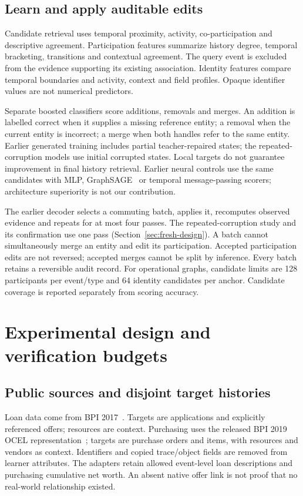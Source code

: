 \documentclass[11pt]{article}
\begin{document}
\subsection{Learn and apply auditable edits}
Candidate retrieval uses temporal proximity, activity, co-participation and descriptive agreement. Participation features summarize history degree, temporal bracketing, transitions and contextual agreement. The query event is excluded from the evidence supporting its existing association. Identity features compare temporal boundaries and activity, context and field profiles. Opaque identifier values are not numerical predictors.

Separate boosted classifiers score additions, removals and merges. An addition is labelled correct when it supplies a missing reference entity; a removal when the current entity is incorrect; a merge when both handles refer to the same entity. Earlier generated training includes partial teacher-repaired states; the repeated-corruption models use initial corrupted states. Local targets do not guarantee improvement in final history retrieval. Earlier neural controls use the same candidates with MLP, GraphSAGE~\cite{graphsage} or temporal message-passing scorers; architecture superiority is not our contribution.

The earlier decoder selects a commuting batch, applies it, recomputes observed evidence and repeats for at most four passes. The repeated-corruption study and its confirmation use one pass (Section~\ref{sec:fresh-design}). A batch cannot simultaneously merge an entity and edit its participation. Accepted participation edits are not reversed; accepted merges cannot be split by inference. Every batch retains a reversible audit record. For operational graphs, candidate limits are 128 participants per event/type and 64 identity candidates per anchor. Candidate coverage is reported separately from scoring accuracy.

\section{Experimental design and verification budgets}
\subsection{Public sources and disjoint target histories}
Loan data come from BPI 2017~\cite{bpi2017}. Targets are applications and explicitly referenced offers; resources are context. Purchasing uses the released BPI 2019 OCEL representation~\cite{bpi2019,bpiconversion,bpiocel}; targets are purchase orders and items, with resources and vendors as context. Identifiers and copied trace/object fields are removed from learner attributes. The adapters retain allowed event-level loan descriptions and purchasing cumulative net worth. An absent native offer link is not proof that no real-world relationship existed.
\end{document}
